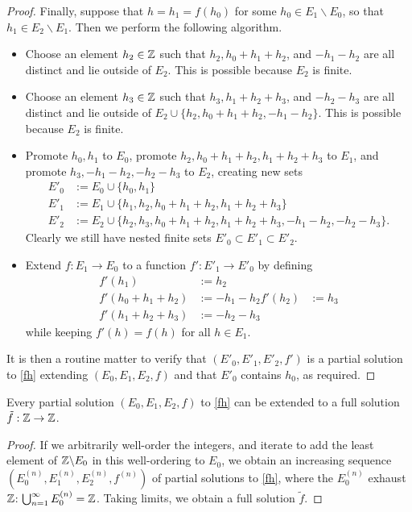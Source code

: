 \begin{proof}
Finally, suppose that $h = h_1 = f(h_0)$ for some $h_0 \in E_1 \backslash E_0$, so that $h_1 \in E_2 \backslash E_1$.  Then we perform the following algorithm.
\begin{itemize}
  \item Choose an element $h_2 \in \mathbb{Z}$ such that $h_2, h_0+h_1+h_2$, and $-h_1-h_2$ are all distinct and lie outside of $E_2$.  This is possible because $E_2$ is finite.
  \item Choose an element $h_3 \in \mathbb{Z}$ such that $h_3, h_1+h_2+h_3$, and $-h_2-h_3$ are all distinct and lie outside of $E_2 \cup \{h_2, h_0+h_1+h_2,-h_1-h_2\}$.  This is possible because $E_2$ is finite.
  \item Promote $h_0, h_1$ to $E_0$, promote $h_2, h_0+h_1+h_2, h_1+h_2+h_3$ to $E_1$, and promote $h_3, -h_1-h_2,-h_2-h_3$ to $E_2$, creating new sets
\begin{align*}
  E'_0 &:= E_0 \cup \{h_0, h_1 \}\\
  E'_1 &:= E_1 \cup \{h_1, h_2, h_0+h_1+h_2, h_1+h_2+h_3 \}\\
  E'_2 &:= E_2 \cup \{h_2, h_3, h_0+h_1+h_2, h_1+h_2+h_3, -h_1-h_2, -h_2-h_3\}.
\end{align*}
Clearly we still have nested finite sets $E'_0 \subset E'_1 \subset E'_2$.
\item Extend $f : E_1 \to E_0$ to a function $f': E'_1 \to E'_0$ by defining
\begin{align*}
  f'(h_1) &:= h_2 \\
  f'(h_0+h_1+h_2) &:= -h_1-h_2
  f'(h_2) &:= h_3 \\
  f'(h_1+h_2+h_3) &:= -h_2-h_3
\end{align*}
while keeping $f'(h)=f(h)$ for all $h \in E_1$.
\end{itemize}
It is then a routine matter to verify that $(E'_0,E'_1,E'_2,f')$ is a partial solution to \eqref{fh} extending $(E_0,E_1,E_2,f)$ and that $E'_0$ contains $h_0$, as required.
\end{proof}

\begin{corollary} \label{extend} Every partial solution $(E_0,E_1,E_2,f)$ to \eqref{fh} can be extended to a full solution $\tilde f: \mathbb{Z} \to \mathbb{Z}$.
\end{corollary}

\begin{proof}
  If we arbitrarily well-order the integers, and iterate  to add the least element of $\mathbb{Z} \backslash E_0$ in this well-ordering to $E_0$, we obtain an increasing sequence $(E^{(n)}_0, E^{(n)}_1, E^{(n)}_2, f^{(n)})$ of partial solutions to \eqref{fh}, where the $E^{(n)}_0$ exhaust $\mathbb{Z}$: $\bigcup_{n=1}^\infty E^{(n)}_0 = \mathbb{Z}$.  Taking limits, we obtain a full solution $\tilde f$.
\end{proof}

